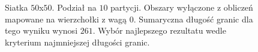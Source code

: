 \begin{figure}[h]
\begin{subfigure}{.33\textwidth}
    \caption[short]{}
\end{subfigure}
\caption{Siatka $50$x$50$. Podział na $10$ partycji.
Obszary wyłączone z obliczeń mapowane na wierzchołki z wagą $0$.
Sumaryczna długość granic dla tego wyniku wynosi $261$.
Wybór najlepszego rezultatu wedle kryterium najmniejszej długości granic.}
\label{result:12}
\end{figure}
\FloatBarrier
\begin{figure}[h]
\centering
\begin{subfigure}{.33\textwidth}
    \centering
    \caption[short]{}
\end{subfigure}%
\begin{subfigure}{.33\textwidth}
    \centering
    \caption[short]{}
\end{subfigure}%
\begin{subfigure}{.33\textwidth}
    \centering

\end{subfigure}
\end{figure}
